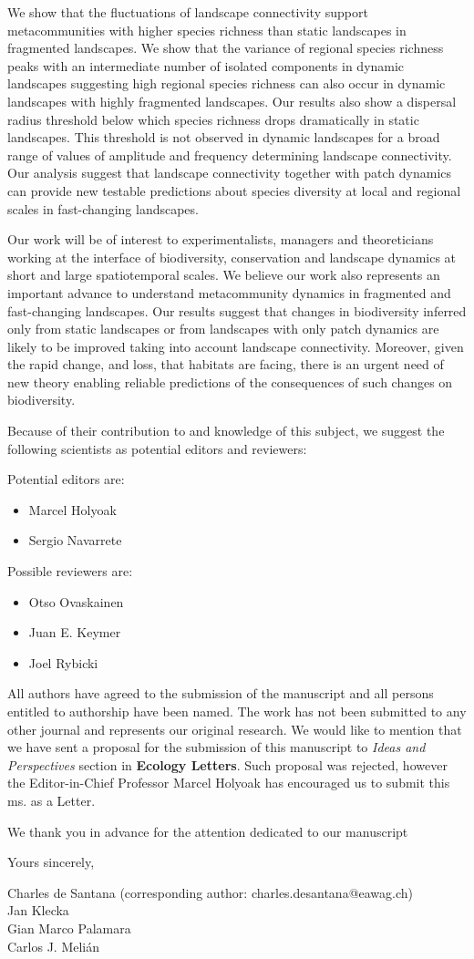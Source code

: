 \documentclass{article}
\begin{document}
We show that the fluctuations of landscape connectivity support metacommunities with higher species richness than static landscapes in fragmented landscapes. We show that the variance of regional species richness peaks with an intermediate number of isolated components in dynamic landscapes suggesting high regional species richness can also occur in dynamic landscapes with highly fragmented landscapes. Our results also show a dispersal radius threshold below which species richness drops dramatically in static landscapes. This threshold is not observed in dynamic landscapes for a broad range of values of amplitude and frequency determining landscape connectivity. Our analysis suggest that landscape connectivity together with patch dynamics can provide new testable predictions about species diversity at local and regional scales in fast-changing landscapes.

Our work will be of interest to experimentalists, managers and theoreticians working at the interface of biodiversity, conservation and landscape dynamics at short and large spatiotemporal scales. We believe our work also represents an important advance to understand metacommunity dynamics in fragmented and fast-changing landscapes.  Our results suggest that changes in biodiversity inferred only from static landscapes or from landscapes with only patch dynamics are likely to be improved taking into account landscape connectivity. Moreover, given the rapid change, and loss, that habitats are facing, there is an urgent need of new theory enabling reliable predictions of the consequences of such changes on biodiversity.

Because of their contribution to and knowledge of this subject, we suggest the following scientists as potential editors and reviewers:

Potential editors are:

\begin{itemize}
\item Marcel Holyoak
\item Sergio Navarrete
\end{itemize}

Possible reviewers are:

\begin{itemize}
\item Otso Ovaskainen
\item Juan E. Keymer
\item Joel Rybicki
\end{itemize}

All authors have agreed to the submission of the manuscript and all persons entitled to authorship have been named. The work has not been submitted to any other journal and represents our original research. We would like to mention that we have sent a proposal for the submission of this manuscript to \emph{Ideas and Perspectives} section in \textbf{Ecology Letters}. Such proposal was rejected, however the Editor-in-Chief Professor Marcel Holyoak has encouraged us to submit this ms. as a Letter.

We thank you in advance for the attention dedicated to our manuscript

Yours sincerely,
\vspace{0.1 in}

\noindent Charles de Santana (corresponding author: charles.desantana@eawag.ch)\\
Jan Klecka\\
Gian Marco Palamara\\
Carlos J. Meli\'an\\
\end{document}
